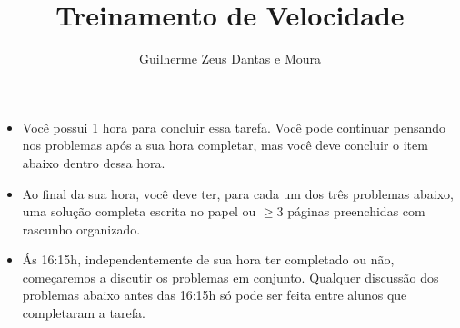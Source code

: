 \documentclass[11pt,a4paper]{article}
\title{Treinamento de Velocidade}
\author{Guilherme Zeus Dantas e Moura}
\begin{document}
	
	\zeustitle

	\begin{itemize}
		\item Você possui 1 hora para concluir essa tarefa. Você pode continuar pensando nos problemas após a sua hora completar, mas você deve concluir o item abaixo dentro dessa hora.
		\item Ao final da sua hora, você deve ter, para cada um dos três problemas abaixo, uma solução completa escrita no papel ou \(\geq 3\) páginas preenchidas com rascunho organizado.
		\item Ás 16:15h, independentemente de sua hora ter completado ou não, começaremos a discutir os problemas em conjunto. Qualquer discussão dos problemas abaixo antes das 16:15h só pode ser feita entre alunos que completaram a tarefa.
	\end{itemize}

\end{document}
